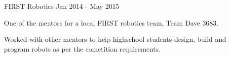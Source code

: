 \begin{cventries}
  \cvprojectentry
    {FIRST Robotics} %
    {Jan 2014 - May 2015}
    {
      \begin{cvitems} %
        \item {One of the mentors for a local FIRST robotics team, Team Dave 3683.}
        \item {Worked with other mentors to help highschool students design, build and program robots as per the cometition requirements.}
      \end{cvitems}
    }
\end{cventries}
